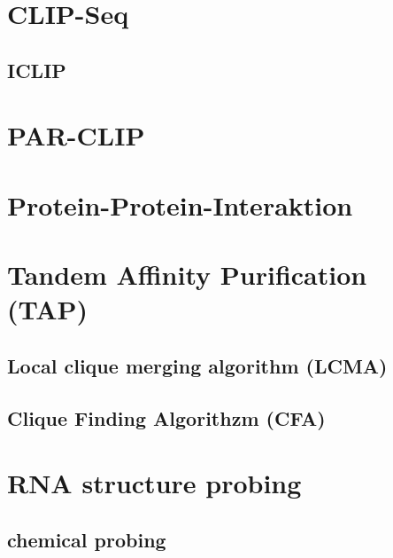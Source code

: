 \documentclass[12pt,a4paper]{article}
\begin{document}
\section{CLIP-Seq}

\subsection{ICLIP}

\section{PAR-CLIP}

\section{Protein-Protein-Interaktion}

\section{Tandem Affinity Purification (TAP)}

\subsection{Local clique merging algorithm (LCMA)}

\subsection{Clique Finding Algorithzm (CFA)}

\section{RNA structure probing}

\subsection{chemical probing}



\newpage



\newpage



\newpage



\newpage


\end{document}
